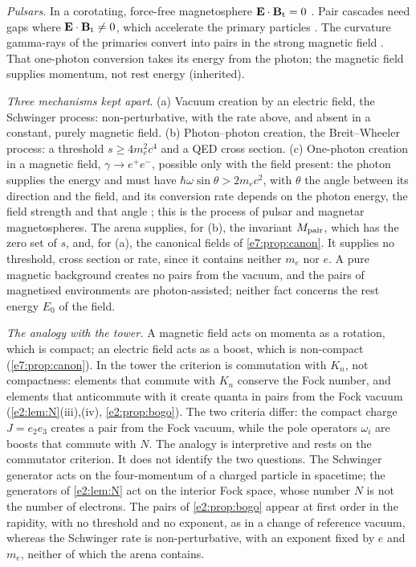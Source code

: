 \emph{Pulsars.} In a corotating, force-free magnetosphere $\mathbf E\cdot\mathbf B_{\rm t}=0$ \cite{GoldreichJulian69}. Pair cascades need gaps where
$\mathbf E\cdot\mathbf B_{\rm t}\neq0$, which accelerate the primary particles \cite{RudermanSutherland75}. The curvature gamma-rays of the primaries convert into
pairs in the strong magnetic field \cite{Sturrock71}. That one-photon conversion takes its energy from the photon; the magnetic field supplies
momentum, not rest energy (inherited).

\emph{Three mechanisms kept apart}. (a) Vacuum creation by an electric field, the Schwinger process: non-perturbative, with the
rate above, and absent in a constant, purely magnetic field. (b) Photon--photon creation, the Breit--Wheeler process: a threshold
$s\ge4m_e^2c^4$ and a QED cross section. (c) One-photon creation in a magnetic field, $\gamma\to e^+e^-$, possible only with the field present: the
photon supplies the energy and must have $\hbar\omega\sin\theta>2m_ec^2$, with $\theta$ the angle between its direction and the field, and its
conversion rate depends on the photon energy, the field strength and that angle \cite{Erber66}; this is the process of pulsar and magnetar
magnetospheres. The arena supplies, for (b), the invariant $M_{\rm pair}$, which has the zero set of $s$, and, for (a), the canonical fields of
\cref{e7:prop:canon}. It supplies no threshold, cross section or rate, since it contains neither $m_e$ nor $e$. A pure magnetic background
creates no pairs from the vacuum, and the pairs of magnetised environments are photon-assisted; neither fact concerns the rest energy $E_0$ of
the field.

\emph{The analogy with the tower.} A magnetic field acts on momenta as a rotation, which is compact; an electric field acts as a boost, which is
non-compact (\cref{e7:prop:canon}). In the tower the criterion is commutation with $K_n$, not compactness: elements that commute with $K_n$
conserve the Fock number, and elements that anticommute with it create quanta in pairs from the Fock vacuum (\cref{e2:lem:N}(iii),(iv),
\cref{e2:prop:bogo}). The two criteria differ: the compact charge $J=e_2e_3$ creates a pair from the Fock vacuum, while the pole operators
$\omega_i$ are boosts that commute with $N$. The analogy is interpretive and rests on the commutator criterion. It does not identify the two
questions. The Schwinger generator acts on the four-momentum of a charged particle in spacetime; the generators of
\cref{e2:lem:N} act on the interior Fock space, whose number $N$ is not the number of electrons. The pairs of \cref{e2:prop:bogo} appear at first
order in the rapidity, with no threshold and no exponent, as in a change of reference vacuum, whereas the Schwinger rate is non-perturbative,
with an exponent fixed by $e$ and $m_e$, neither of which the arena contains.


